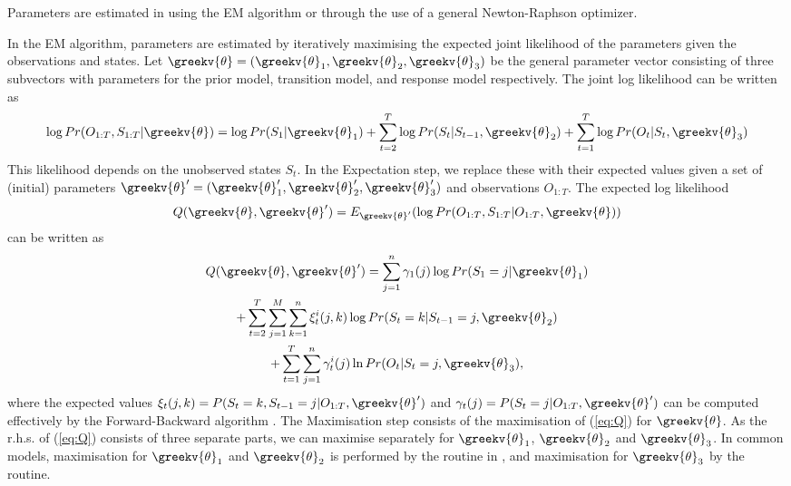 \documentclass[article]{jss}
\begin{document}
Parameters are estimated in  using the EM algorithm or
through the use of a general Newton-Raphson optimizer.  

In the EM algorithm, parameters are estimated by iteratively maximising the 
expected joint likelihood of the parameters given the observations and states. 
Let $\greekv{\theta} = (\greekv{\theta}_1, \greekv{\theta}_2,\greekv{\theta}_3)$
be the general parameter vector consisting of three subvectors with parameters 
for the prior model, transition model, and response model respectively. The 
joint log likelihood can be written as
\begin{equation}
\log Pr(O_{1:T}, S_{1:T}|\greekv{\theta}) = \log Pr(S_1|\greekv{\theta}_1) 
+ \sum_{t=2}^{T} \log Pr(S_t|S_{t-1},\greekv{\theta}_2) 
+ \sum_{t=1}^{T} \log Pr(O_t|S_t,\greekv{\theta}_3)
\end{equation}
This likelihood depends on the unobserved states $S_t$. In the Expectation step,
we replace these with their expected values given a set of (initial) parameters 
$\greekv{\theta}' = (\greekv{\theta}'_1, \greekv{\theta}'_2,\greekv{\theta}'_3)$
and observations $O_{1:T}$. The expected log likelihood 
\begin{equation}
Q(\greekv{\theta},\greekv{\theta}') = E_{\greekv{\theta}'} 
(\log Pr(O_{1:T},S_{1:T}|O_{1:T},\greekv{\theta}))
\end{equation}
can be written as
\begin{multline}
\label{eq:Q}
Q(\greekv{\theta},\greekv{\theta}') = 
\sum_{j=1}^n \gamma_1(j) \log Pr(S_1=j|\greekv{\theta}_1) \\ 
+ \sum_{t=2}^T \sum_{j=1}^M \sum_{k=1}^n \xi_t^i(j,k) \log Pr(S_t = k|S_{t-1} 
= j,\greekv{\theta}_2) \\ + \sum_{t=1}^T \sum_{j=1}^n \gamma_t^i(j) 
\ln Pr(O_t|S_t=j,\greekv{\theta}_3),
\end{multline}
where the expected values $\xi_t(j,k) =  P(S_t = k, S_{t-1} = j|O_{1:T},\greekv{\theta}')$ and $\gamma_t(j) = P(S_t = j|O_{1:T},\greekv{\theta}')$ can be computed effectively by the Forward-Backward algorithm \citep[see e.g.,][]{Rabiner1989}. The Maximisation step consists of the maximisation of (\ref{eq:Q}) for $\greekv{\theta}$. As the r.h.s. of (\ref{eq:Q}) consists of three separate parts, we can maximise separately for $\greekv{\theta}_1$, $\greekv{\theta}_2$ and $\greekv{\theta}_3$. In common models, maximisation for $\greekv{\theta}_1$ and $\greekv{\theta}_2$ is performed by the  routine in , and maximisation for $\greekv{\theta}_3$ by the  routine. 
\end{document}
